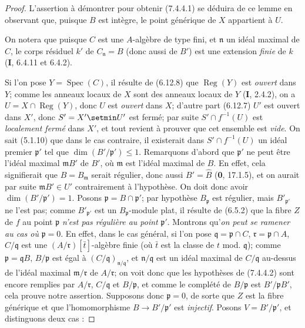 \begin{proof}
L'assertion à démontrer pour obtenir (7.4.4.1) se déduira de ce lemme en
observant que, puisque $B$ est intègre, le point générique de $X$ appartient
à $U$.

On notera que puisque $C$ est une $A$-algèbre de type fini, et $\mathfrak n$
un idéal maximal de $C$, le corps résiduel $k'$ de
$C_{\mathfrak n}=B$ (donc aussi de $B'$) est une extension \emph{finie} de $k$
(\textbf{I}, 6.4.11 et 6.4.2).

Si l'on pose $Y=\operatorname{Spec}(C)$, il résulte de (6.12.8) que
$\operatorname{Reg}(Y)$ est \emph{ouvert} dans $Y$; comme les anneaux locaux de
$X$ sont des anneaux locaux de $Y$ (\textbf{I}, 2.4.2), on a
$U=X\cap\operatorname{Reg}(Y)$, donc $U$ est \emph{ouvert} dans $X$; d'autre part
(6.12.7) $U'$ est ouvert dans $X'$, donc $S'=X'\setmin U'$ est fermé; par suite
$S'\cap f^{-1}(U)$ est \emph{localement fermé} dans $X'$, et tout revient à
prouver que cet ensemble est \emph{vide}. On sait (5.1.10) que dans le cas
contraire, il existerait dans $S'\cap f^{-1}(U)$ un idéal premier
$\mathfrak p'$ tel que $\dim(B'/\mathfrak p')\leqslant1$. Remarquons d'abord
que $\mathfrak p'$ ne peut être l'idéal maximal $\mathfrak mB'$ de $B'$,
où $\mathfrak m$ est l'idéal maximal de $B$. En effet, cela signifierait que
$B=B_{\mathfrak m}$ serait régulier, donc aussi $B'=\widehat B$ (\textbf{0},
17.1.5), et on aurait par suite $\mathfrak mB'\in U'$ contrairement à
l'hypothèse. On doit donc avoir $\dim(B'/\mathfrak p')=1$. Posons
$\mathfrak p=B\cap\mathfrak p'$; par hypothèse $B_{\mathfrak p}$ est
régulier, mais $B'_{\mathfrak p'}$ ne l'est pas; comme
$B'_{\mathfrak p'}$ est un $B_{\mathfrak p}$-module plat, il résulte de
(6.5.2) que la fibre $Z$ de $f$ au point $\mathfrak p$ \emph{n'est pas régulière
au point} $\mathfrak p'$. Montrons qu'\emph{on peut se ramener au cas où}
$\mathfrak p=0$. En effet, dans le cas général, si l'on pose
$\mathfrak q=\mathfrak p\cap C$, $\mathfrak r=\mathfrak p\cap A$,
$C/\mathfrak q$ est une $(A/\mathfrak r)[\bar t]$-algèbre finie (où
$\bar t$ est la classe de $t$ mod. $\mathfrak q$); comme
$\mathfrak p=\mathfrak qB$, $B/\mathfrak p$ est égal à
$(C/\mathfrak q)_{\mathfrak n/\mathfrak q}$, et
$\mathfrak n/\mathfrak q$ est un idéal maximal de $C/\mathfrak q$
au-dessus de l'idéal maximal $\mathfrak m/\mathfrak r$ de
$A/\mathfrak r$; on voit donc que les hypothèses de (7.4.4.2) sont encore
remplies par $A/\mathfrak r$, $C/\mathfrak q$ et $B/\mathfrak p$, et comme
le complété de $B/\mathfrak p$ est $B'/\mathfrak pB'$, cela prouve notre
assertion. Supposons donc $\mathfrak p=0$, de sorte que $Z$ est la fibre
générique et que l'homomorphisme $B\to B'/\mathfrak p'$ est \emph{injectif}.
Posons $V=B'/\mathfrak p'$, et distinguons deux cas :


\end{proof}
